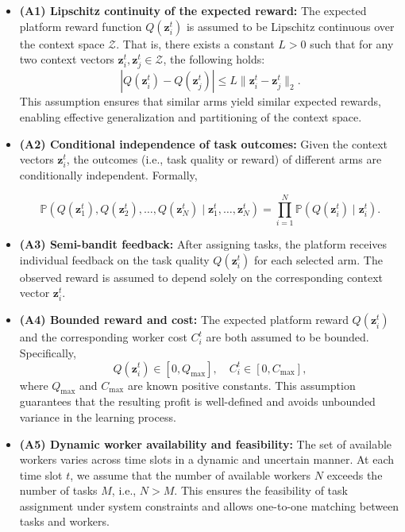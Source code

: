 \begin{itemize}
    \item \textbf{(A1) Lipschitz continuity of the expected reward:}  
    The expected platform reward function \( Q(\mathbf{z}_i^t) \) is assumed to be Lipschitz continuous over the context space \( \mathcal{Z} \). That is, there exists a constant \( L > 0 \) such that for any two context vectors \( \mathbf{z}_i^t, \mathbf{z}_j^t \in \mathcal{Z} \), the following holds:
    \[
    \left| Q(\mathbf{z}_i^t) - Q(\mathbf{z}_j^t) \right| \leq L \| \mathbf{z}_i^t - \mathbf{z}_j^t \|_2.
    \]
    This assumption ensures that similar arms yield similar expected rewards, enabling effective generalization and partitioning of the context space.


    \item \textbf{(A2) Conditional independence of task outcomes:}  
    Given the context vectors \( \mathbf{z}_i^t \), the outcomes (i.e., task quality or reward) of different arms are conditionally independent. 
    Formally,
    
    \[
    \mathbb{P}(Q(\mathbf{z}_1^t), Q(\mathbf{z}_2^t), \dots, Q(\mathbf{z}_N^t) \mid \mathbf{z}_1^t, \dots, \mathbf{z}_N^t) = \prod_{i=1}^{N} \mathbb{P}(Q(\mathbf{z}_i^t) \mid \mathbf{z}_i^t).
    \]

    \item \textbf{(A3) Semi-bandit feedback:}  
    After assigning tasks, the platform receives individual feedback on the task quality \( Q(\mathbf{z}_i^t) \) for each selected arm. The observed reward is assumed to depend solely on the corresponding context vector \( \mathbf{z}_i^t \).


    \item \textbf{(A4) Bounded reward and cost:}  
    The expected platform reward \( Q(\mathbf{z}_i^t) \) and the corresponding worker cost \( C_i^t \) are both assumed to be bounded. Specifically,
    \[
    Q(\mathbf{z}_i^t) \in [0, Q_{\max}], \quad C_i^t \in [0, C_{\max}],
    \]
    where \( Q_{\max} \) and \( C_{\max} \) are known positive constants. This assumption guarantees that the resulting profit is well-defined and avoids unbounded variance in the learning process.

    \item \textbf{(A5) Dynamic worker availability and feasibility:}  
The set of available workers varies across time slots in a dynamic and uncertain manner. At each time slot \( t \), we assume that the number of available workers \( N \) exceeds the number of tasks \( M \), i.e., \( N > M \). This ensures the feasibility of task assignment under system constraints and allows one-to-one matching between tasks and workers.
\end{itemize}


